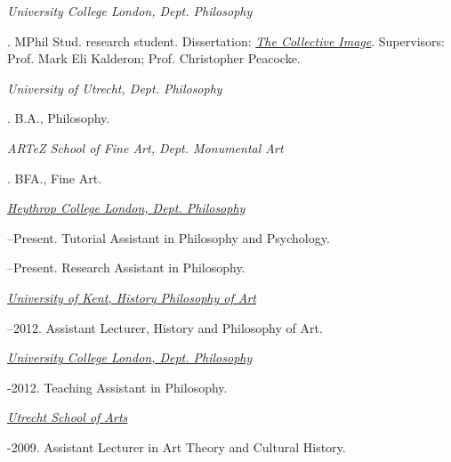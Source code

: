 \documentclass[11pt]{article}
\begin{document}
\noindent\emph{University College London, Dept. Philosophy \vspace{0.01in}}


. MPhil Stud. research student. Dissertation: \href{http://discovery.ucl.ac.uk/1348204/}{\emph{The Collective Image}}. Supervisors: Prof. Mark Eli Kalderon; Prof. Christopher Peacocke. \vspace{-0.1in}

\bigskip

\noindent\emph{University of Utrecht, Dept. Philosophy\vspace{0.02in}}

. B.A., Philosophy.

\medskip

\noindent\emph{ARTeZ School of Fine Art, Dept. Monumental Art\vspace{0.02in}}

. BFA., Fine Art.

\bigskip


\noindent\href{http://www.heythrop.ac.uk/departments/academic-departments/philosophy/}{\emph{Heythrop College London, Dept. Philosophy} \vspace{0.01in}}

--Present. Tutorial Assistant in Philosophy and Psychology.

--Present. Research Assistant in Philosophy.

\medskip

\noindent\href{http://www.kent.ac.uk/arts/hpa/index.html}{\emph{University of Kent, History \amper Philosophy of Art} \vspace{0.01in}}

--2012. Assistant Lecturer, History and Philosophy of Art.

\medskip

\noindent\href{http://www.ucl.ac.uk/philosophy/}{\emph{University College London, Dept. Philosophy}} \vspace{0.01in}

-2012. Teaching Assistant in Philosophy.

\medskip

\noindent\href{http://www.hku.nl/web/English.htm}{\emph{Utrecht School of Arts} \vspace{0.01in}}

-2009. Assistant Lecturer in Art Theory and Cultural History.
\end{document}
